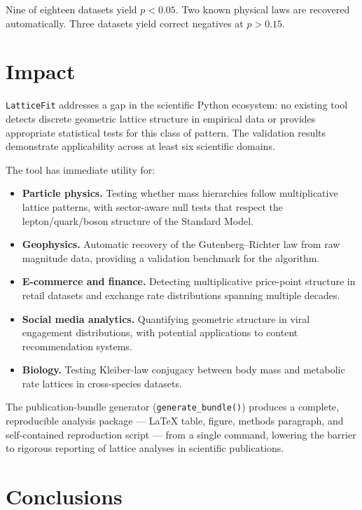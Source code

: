 \documentclass[preprint,12pt]{elsarticle}
\begin{document}
Nine of eighteen datasets yield $p < 0.05$. Two known physical
laws are recovered automatically. Three datasets yield correct
negatives at $p > 0.15$.

\section{Impact}

\texttt{LatticeFit} addresses a gap in the scientific Python
ecosystem: no existing tool detects discrete geometric lattice
structure in empirical data or provides appropriate statistical
tests for this class of pattern. The validation results demonstrate
applicability across at least six scientific domains.

The tool has immediate utility for:

\begin{itemize}
\item \textbf{Particle physics.} Testing whether mass hierarchies
      follow multiplicative lattice patterns, with sector-aware
      null tests that respect the lepton/quark/boson structure of
      the Standard Model.
\item \textbf{Geophysics.} Automatic recovery of the
      Gutenberg--Richter law from raw magnitude data, providing a
      validation benchmark for the algorithm.
\item \textbf{E-commerce and finance.} Detecting multiplicative
      price-point structure in retail datasets and exchange rate
      distributions spanning multiple decades.
\item \textbf{Social media analytics.} Quantifying geometric
      structure in viral engagement distributions, with potential
      applications to content recommendation systems.
\item \textbf{Biology.} Testing Kleiber-law conjugacy between
      body mass and metabolic rate lattices in cross-species
      datasets.
\end{itemize}

The publication-bundle generator (\texttt{generate\_bundle()})
produces a complete, reproducible analysis package --- LaTeX
table, figure, methods paragraph, and self-contained reproduction
script --- from a single command, lowering the barrier to rigorous
reporting of lattice analyses in scientific publications.

\section{Conclusions}
\end{document}
